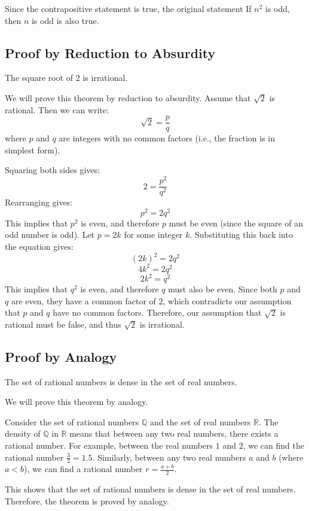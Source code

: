 	Since the contrapositive statement is true, the original statement If \( n^2 \) is odd, then \( n \) is odd is also true.
\QED

\subsection{Proof by Reduction to Absurdity}

The square root of \( 2 \) is irrational.
\vspace{\baselineskip}

	We will prove this theorem by reduction to absurdity. Assume that \( \sqrt{2} \) is rational. Then we can write:
	\[
		\sqrt{2} = \frac{p}{q}
	\]
	where \( p \) and \( q \) are integers with no common factors (i.e., the fraction is in simplest form).
\vspace{\baselineskip}

	Squaring both sides gives:
	\[
		2 = \frac{p^2}{q^2}
	\]
	Rearranging gives:
	\[
		p^2 = 2q^2
	\]
	This implies that \( p^2 \) is even, and therefore \( p \) must be even (since the square of an odd number is odd).
	Let \( p = 2k \) for some integer \( k \). Substituting this back into the equation gives:
	\[
		{(2k)}^2 = 2q^2
	\]
	\[
		4k^2 = 2q^2
	\]
	\[
		2k^2 = q^2
	\]
	This implies that \( q^2 \) is even, and therefore \( q \) must also be even.
	Since both \( p \) and \( q \) are even, they have a common factor of \( 2 \), which contradicts our assumption that \( p \) and \( q \) have no common factors.
	Therefore, our assumption that \( \sqrt{2} \) is rational must be false, and thus \( \sqrt{2} \) is irrational.

\QED

\subsection{Proof by Analogy}

The set of rational numbers is dense in the set of real numbers.

We will prove this theorem by analogy.
\vspace{\baselineskip}
	
Consider the set of rational numbers \( \mathbb{Q} \) and the set of real numbers \( \mathbb{R} \). The density of \( \mathbb{Q} \) in \( \mathbb{R} \) means that between any two real numbers, there exists a rational number.
For example, between the real numbers \( 1 \) and \( 2 \), we can find the rational number \( \frac{3}{2} = 1.5 \). Similarly, between any two real numbers \( a \) and \( b \) (where \( a < b \)), we can find a rational number \( r = \frac{a + b}{2} \).
\vspace{\baselineskip}

This shows that the set of rational numbers is dense in the set of real numbers.
Therefore, the theorem is proved by analogy.

\QED


